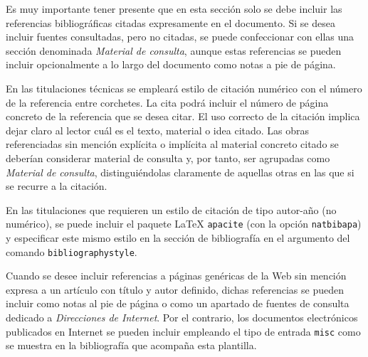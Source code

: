 Es muy importante tener presente que en esta sección solo se debe incluir las referencias bibliográficas citadas expresamente en el documento. Si se desea incluir fuentes consultadas, pero no citadas, se puede confeccionar con ellas una sección denominada \emph{Material de consulta}, aunque estas referencias se pueden incluir opcionalmente a lo largo del documento como notas a pie de página.

En las titulaciones técnicas se empleará estilo de citación numérico con el número de la referencia entre corchetes. La cita podrá incluir el número de página concreto de la referencia que se desea citar. El uso correcto de la citación implica dejar claro al lector cuál es el texto, material o idea citado. Las obras referenciadas sin mención explícita o implícita al material concreto citado se deberían considerar material de consulta y, por tanto, ser agrupadas como \emph{Material de consulta}, distinguiéndolas claramente de aquellas otras en las que si se recurre a la citación.

En las titulaciones que requieren un estilo de citación de tipo autor-año (no numérico), se puede incluir el paquete \LaTeX{} \texttt{apacite} (con la opción \texttt{natbibapa}) y especificar este mismo estilo en la sección de bibliografía en el argumento del comando \texttt{bibliographystyle}.

Cuando se desee incluir referencias a páginas genéricas de la Web sin mención expresa a un artículo con título y autor definido, dichas referencias se pueden incluir como notas al pie de página o como un apartado de fuentes de consulta dedicado a \emph{Direcciones de Internet}. Por el contrario, los documentos electrónicos publicados en Internet se pueden incluir empleando el tipo de entrada \texttt{misc} como se muestra en la bibliografía que acompaña esta plantilla.




